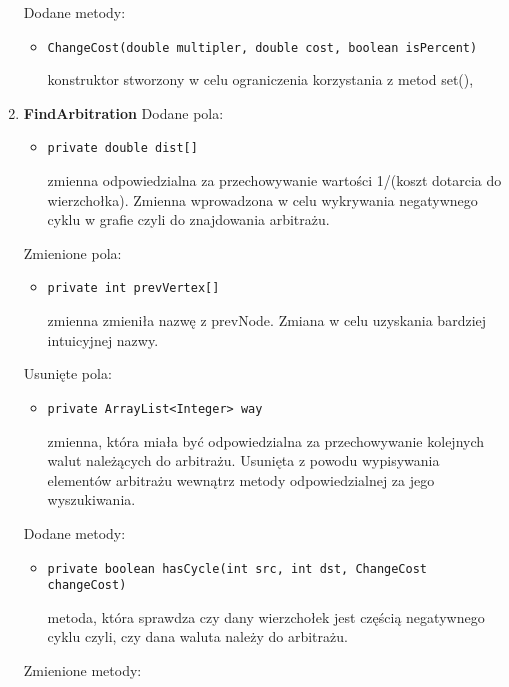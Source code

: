 \documentclass[12pt]{article}
\begin{document}
\begin{enumerate}
    Dodane metody:
     \begin{itemize}
    \item \begin{verbatim}ChangeCost(double multipler, double cost, boolean isPercent)\end{verbatim}
        konstruktor stworzony w celu ograniczenia korzystania z metod set(),
    \end{itemize}
\item \textbf{FindArbitration}
\newline\newline
   Dodane pola:
    \begin{itemize}
        \item \begin{verbatim}private double dist[]\end{verbatim}
        zmienna odpowiedzialna za przechowywanie wartości 1/(koszt dotarcia do wierzchołka). Zmienna wprowadzona w celu wykrywania negatywnego cyklu w grafie czyli do znajdowania arbitrażu.
    \end{itemize}
    Zmienione pola:
    \begin{itemize}
    \item \begin{verbatim}private int prevVertex[]\end{verbatim}
        zmienna zmieniła nazwę z prevNode. Zmiana w celu uzyskania bardziej intuicyjnej nazwy.
    \end{itemize}
    Usunięte pola:
     \begin{itemize}
     \item \begin{verbatim}private ArrayList<Integer> way\end{verbatim}
        zmienna, która miała być odpowiedzialna za przechowywanie kolejnych walut należących do arbitrażu. Usunięta z powodu wypisywania elementów arbitrażu wewnątrz metody odpowiedzialnej za jego wyszukiwania.
    \end{itemize}
    Dodane metody:
    \begin{itemize}
     \item \begin{verbatim}private boolean hasCycle(int src, int dst, ChangeCost changeCost)\end{verbatim}
        metoda, która sprawdza czy dany wierzchołek jest częścią negatywnego cyklu czyli, czy dana waluta należy do arbitrażu.
    \end{itemize}
    Zmienione metody:
    \begin{itemize}

\end{itemize}
\end{enumerate}
\end{document}
